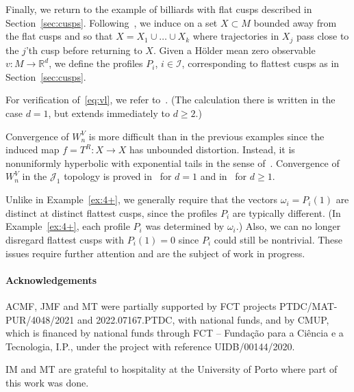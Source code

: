\documentclass[12pt]{article}
\numberwithin{equation}{section}
\newcommand{\R}{{\mathbb R}}
\newcommand{\cI}{{\mathcal I}}
\newcommand{\cJ}{{\mathcal J}}
\begin{document}
\begin{example} \label{ex:cusps+}
Finally, we return to the example of billiards with flat cusps described in Section~\ref{sec:cusps}.
Following~\cite{JungPeneZhang20}, we induce on a set $X\subset M$ bounded away from the flat cusps and so that $X=X_1\cup\dots\cup X_k$ where trajectories in $X_j$ pass close to the $j$'th cusp before returning to $X$.
Given a H\"older mean zero observable $v:M\to\R^d$, we define the profiles $P_i$, $i\in\cI$, corresponding to flattest cusps as in Section~\ref{sec:cusps}.

For verification of~\eqref{eq:vl}, we refer to~\cite[Proposition~8.1]{MV20}.
(The calculation there is written in the case $d=1$, but extends immediately to $d\ge2$.)

Convergence of $W_n^V$ is more difficult than in the previous examples since the induced map $f=T^R:X\to X$ has unbounded distortion. Instead, it is nonuniformly hyperbolic with exponential tails in the sense of~\cite{Young98}.
Convergence of $W_n^V$ in the $\cJ_1$ topology is proved in~\cite{JungPeneZhang20} for $d=1$ and in~\cite[Section~5]{CKMprep} for $d\ge1$. 

Unlike in Example~\ref{ex:4+}, we generally require that the vectors $\omega_i=P_i(1)$ are distinct at distinct flattest cusps, since the profiles $P_i$ are typically different. (In Example~\ref{ex:4+}, each profile $P_i$ was determined by $\omega_i$.) Also, we can no longer disregard flattest cusps with $P_i(1)=0$ since $P_i$ could still be nontrivial. These issues require further attention and are the subject of work in progress.
\end{example}


 \paragraph{Acknowledgements}
 ACMF, JMF and MT were partially supported by FCT projects PTDC/MAT-PUR/4048/2021 and 2022.07167.PTDC, with national funds, and by CMUP, which is financed by national funds through FCT -- Funda\c{c}\~ao para a Ci\^encia e a Tecnologia, I.P., under the project with reference UIDB/00144/2020.

IM and MT are grateful to hospitality at the University of Porto
 where part of this work was done.
\end{document}
